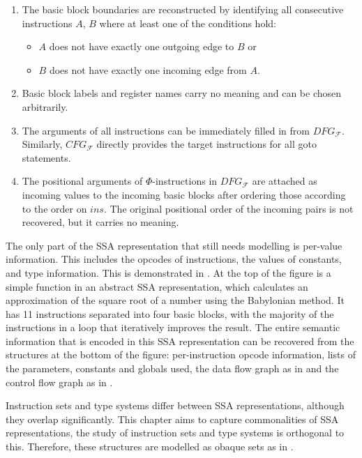 \begin{enumerate}
    \item The basic block boundaries are reconstructed by identifying all
          consecutive instructions $A$, $B$ where at least one of the
    conditions hold:
    \begin{itemize}
        \item $A$ does not have exactly one outgoing edge to $B$ or
        \item $B$ does not have exactly one incoming edge from $A$.
    \end{itemize}
    \item Basic block labels and register names carry no meaning and can be
          chosen arbitrarily.
    \item The arguments of all instructions can be immediately filled in from 
          $DFG_\mathcal F$.
          Similarly, $CFG_\mathcal F$ directly provides the target instructions
          for all goto statements.
    \item The positional arguments of $\Phi$-instructions in $DFG_\mathcal F$
          are attached as incoming values to the incoming basic blocks
          after ordering those according to the order on $ins$.
          The original positional order of the incoming pairs is
          not recovered, but it carries no meaning.
\end{enumerate}

    The only part of the SSA representation that still needs modelling is
    per-value information.
    This includes the opcodes of instructions, the values of constants,
    and type information.
    This is demonstrated in .
    At the top of the figure is a simple function in an abstract SSA
    representation, which calculates an approximation of the square root of a
    number using the Babylonian method.
    It has 11 instructions separated into four basic blocks, with the majority
    of the instructions in a loop that iteratively improves the result.
    The entire semantic information that is encoded in this SSA representation
    can be recovered from the structures at the bottom of the figure:
    per-instruction opcode information, lists of the parameters, constants and
    globals used, the data flow graph as in  and the control
    flow graph as in .

    Instruction sets and type systems differ between SSA representations,
    although they overlap significantly.
    This chapter aims to capture commonalities of SSA representations, the study
    of instruction sets and type systems is orthogonal to this.
    Therefore, these structures  are modelled as obaque sets as in
    .


